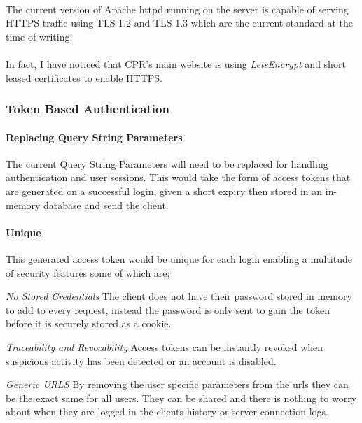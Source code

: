 \paragraph{}
The current version of Apache httpd running on the server is capable of serving HTTPS traffic using TLS 1.2 and TLS 1.3 which are the current
standard at the time of writing.

\paragraph{}
In fact, I have noticed that CPR's main website is using \emph{LetsEncrypt} and short leased certificates to enable HTTPS.

\subsubsection{Token Based Authentication}
\paragraph{Replacing Query String Parameters}
The current Query String Parameters will need to be replaced for handling authentication and user sessions. 
This would take the form of access tokens that are generated on a successful login, given a short expiry then stored in an in-memory database and
send the client.

\paragraph{Unique}
This generated access token would be unique for each login enabling a multitude of security features some of which are;
\begin{description}

    \item \emph{No Stored Credentials} The client does not have their password stored in memory to add to every request,
    instead the password is only sent to gain the token before it is securely stored as a cookie.
    \item \emph{Traceability and Revocability} Access tokens can be instantly revoked when suspicious activity has been detected or an account is disabled.
    \item \emph{Generic URLS} By removing the user specific parameters from the urls they can be the exact same for all users.
    They can be shared and there is nothing to worry about when they are logged in the clients history or server connection logs.

\end{description}

